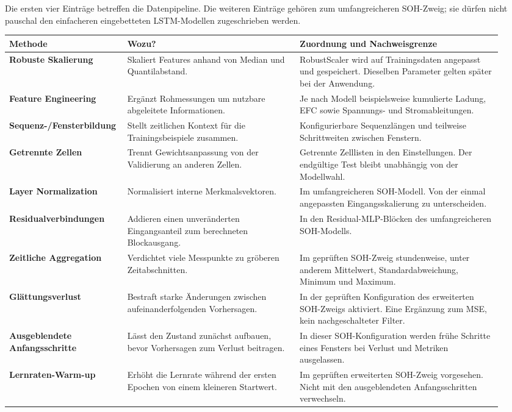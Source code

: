 \clearpage
{}
Die ersten vier Einträge betreffen die Datenpipeline. Die weiteren Einträge gehören zum umfangreicheren SOH-Zweig; sie dürfen nicht pauschal den einfacheren eingebetteten LSTM-Modellen zugeschrieben werden.
\begingroup\footnotesize\setlength{\tabcolsep}{4pt}\renewcommand{\arraystretch}{1.08}
\begin{longtable}{@{}p{0.20\linewidth}p{0.34\linewidth}p{0.40\linewidth}@{}}\toprule\textbf{Methode} & \textbf{Wozu?} & \textbf{Zuordnung und Nachweisgrenze}\\\midrule\endhead
\textbf{Robuste Skalierung} & Skaliert Features anhand von Median und Quantilabstand. & RobustScaler wird auf Trainingsdaten angepasst und gespeichert. Dieselben Parameter gelten später bei der Anwendung.\\[5pt]\midrule
\textbf{Feature Engineering} & Ergänzt Rohmessungen um nutzbare abgeleitete Informationen. & Je nach Modell beispielsweise kumulierte Ladung, EFC sowie Spannungs- und Stromableitungen.\\[5pt]\midrule
\textbf{Sequenz-/Fensterbildung} & Stellt zeitlichen Kontext für die Trainingsbeispiele zusammen. & Konfigurierbare Sequenzlängen und teilweise Schrittweiten zwischen Fenstern.\\[5pt]\midrule
\textbf{Getrennte Zellen} & Trennt Gewichtsanpassung von der Validierung an anderen Zellen. & Getrennte Zelllisten in den Einstellungen. Der endgültige Test bleibt unabhängig von der Modellwahl.\\[5pt]\midrule
\textbf{Layer Normalization} & Normalisiert interne Merkmalsvektoren. & Im umfangreicheren SOH-Modell. Von der einmal angepassten Eingangsskalierung zu unterscheiden.\\[5pt]\midrule
\textbf{Residualverbindungen} & Addieren einen unveränderten Eingangsanteil zum berechneten Blockausgang. & In den Residual-MLP-Blöcken des umfangreicheren SOH-Modells.\\[5pt]\midrule
\textbf{Zeitliche Aggregation} & Verdichtet viele Messpunkte zu gröberen Zeitabschnitten. & Im geprüften SOH-Zweig stundenweise, unter anderem Mittelwert, Standardabweichung, Minimum und Maximum.\\[5pt]\midrule
\textbf{Glättungsverlust} & Bestraft starke Änderungen zwischen aufeinanderfolgenden Vorhersagen. & In der geprüften Konfiguration des erweiterten SOH-Zweigs aktiviert. Eine Ergänzung zum MSE, kein nachgeschalteter Filter.\\[5pt]\midrule
\textbf{Ausgeblendete Anfangsschritte} & Lässt den Zustand zunächst aufbauen, bevor Vorhersagen zum Verlust beitragen. & In dieser SOH-Konfiguration werden frühe Schritte eines Fensters bei Verlust und Metriken ausgelassen.\\[5pt]\midrule
\textbf{Lernraten-Warm-up} & Erhöht die Lernrate während der ersten Epochen von einem kleineren Startwert. & Im geprüften erweiterten SOH-Zweig vorgesehen. Nicht mit den ausgeblendeten Anfangsschritten verwechseln.\\[5pt]\midrule
\end{longtable}\endgroup

